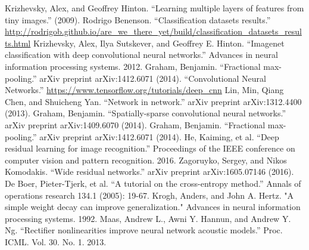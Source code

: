\documentclass[conference]{IEEEtran}
\begin{document}
\FloatBarrier
\begin{thebibliography}{00}
 Krizhevsky, Alex, and Geoffrey Hinton. ``Learning multiple layers of features from tiny images.'' (2009).
 Rodrigo Benenson. ``Classification datasets results.'' \url{http://rodrigob.github.io/are_we_there_yet/build/classification_datasets_results.html}
Krizhevsky, Alex, Ilya Sutskever, and Geoffrey E. Hinton. ``Imagenet classification with deep convolutional neural networks.'' Advances in neural information processing systems. 2012.
 Graham, Benjamin. ``Fractional max-pooling.'' arXiv preprint arXiv:1412.6071 (2014).
 ``Convolutional Neural Networks.'' \url{ https://www.tensorflow.org/tutorials/deep_cnn}
 Lin, Min, Qiang Chen, and Shuicheng Yan. ``Network in network.'' arXiv preprint arXiv:1312.4400 (2013).
 Graham, Benjamin. ``Spatially-sparse convolutional neural networks.'' arXiv preprint arXiv:1409.6070 (2014).
 Graham, Benjamin. ``Fractional max-pooling.'' arXiv preprint arXiv:1412.6071 (2014).
 He, Kaiming, et al. ``Deep residual learning for image recognition.'' Proceedings of the IEEE conference on computer vision and pattern recognition. 2016.
 Zagoruyko, Sergey, and Nikos Komodakis. ``Wide residual networks.'' arXiv preprint arXiv:1605.07146 (2016).
 De Boer, Pieter-Tjerk, et al. ``A tutorial on the cross-entropy method.'' Annals of operations research 134.1 (2005): 19-67.
 Krogh, Anders, and John A. Hertz. "A simple weight decay can improve generalization." Advances in neural information processing systems. 1992.
 Maas, Andrew L., Awni Y. Hannun, and Andrew Y. Ng. ``Rectifier nonlinearities improve neural network acoustic models.'' Proc. ICML. Vol. 30. No. 1. 2013.
\end{thebibliography}
\end{document}
